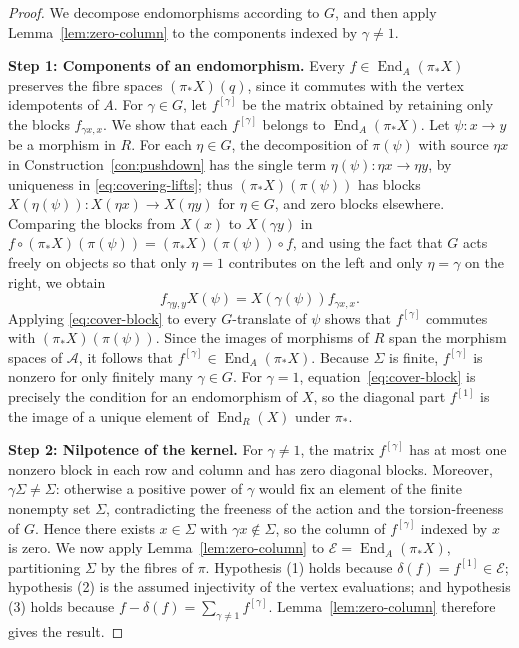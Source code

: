 \documentclass[a4paper,reqno,10pt]{amsart}
\theoremstyle{definition}
\DeclareMathOperator{\End}{End}
\numberwithin{equation}{section}
\begin{document}
\begin{proof}
We decompose endomorphisms according to $G$, and then apply
Lemma~\ref{lem:zero-column} to the components indexed by $\gamma\ne1$.

\noindent\textbf{Step 1: Components of an endomorphism.}
Every $f\in\End_A(\pi_*X)$ preserves the fibre spaces
$(\pi_*X)(q)$, since it commutes with the vertex idempotents of $A$.
For $\gamma\in G$, let $f^{[\gamma]}$ be the matrix obtained by retaining only the blocks $f_{\gamma x,x}$. We show that each $f^{[\gamma]}$ belongs to $\End_A(\pi_*X)$.
Let $\psi:x\to y$ be a morphism in $R$. For each $\eta\in G$, the
decomposition of $\pi(\psi)$ with source $\eta x$ in
Construction~\ref{con:pushdown} has the single term $\eta(\psi):\eta x\to \eta y$, by
uniqueness in \eqref{eq:covering-lifts}; thus $(\pi_*X)(\pi(\psi))$ has
blocks $X(\eta(\psi)):X(\eta x)\to X(\eta y)$ for $\eta\in G$, and zero blocks elsewhere.
Comparing the blocks from $X(x)$ to $X(\gamma y)$ in
$f\circ(\pi_*X)(\pi(\psi))=(\pi_*X)(\pi(\psi))\circ f$, and using the fact that $G$ acts freely on
objects so that only $\eta=1$ contributes on the left and only $\eta=\gamma$ on the right,
we obtain
\begin{equation}\label{eq:cover-block}
 f_{\gamma y,y}X(\psi)=X(\gamma(\psi))f_{\gamma x,x}.
\end{equation}
Applying \eqref{eq:cover-block} to every $G$-translate of $\psi$ shows
that $f^{[\gamma]}$ commutes with $(\pi_*X)(\pi(\psi))$. Since the images of morphisms
of $R$ span the morphism spaces of $\mathcal A$, it follows that $f^{[\gamma]}\in\End_A(\pi_*X)$.
Because $\Sigma$ is finite, $f^{[\gamma]}$ is nonzero for only finitely many $\gamma\in G$.
For $\gamma=1$, equation~\eqref{eq:cover-block} is precisely the condition for an
endomorphism of $X$, so the diagonal part $f^{[1]}$ is the image of a unique element of
$\End_R(X)$ under $\pi_*$.

\noindent\textbf{Step 2: Nilpotence of the kernel.}
For $\gamma\ne1$, the matrix $f^{[\gamma]}$ has at most one nonzero block in
each row and column and has zero diagonal blocks. Moreover, $\gamma\Sigma\ne\Sigma$:
otherwise a positive power of $\gamma$ would fix an element of the finite
nonempty set $\Sigma$, contradicting the freeness of the action and the
torsion-freeness of $G$. Hence there exists $x\in\Sigma$ with $\gamma x\notin\Sigma$,
so the column of $f^{[\gamma]}$ indexed by $x$ is zero.
We now apply Lemma~\ref{lem:zero-column} to $\mathcal E=\End_A(\pi_*X)$, partitioning
$\Sigma$ by the fibres of $\pi$. Hypothesis (1) holds because
$\delta(f)=f^{[1]}\in \mathcal E$; hypothesis (2) is the assumed
injectivity of the vertex evaluations; and hypothesis (3) holds because
$f-\delta(f)=\sum_{\gamma\ne1}f^{[\gamma]}$. Lemma~\ref{lem:zero-column} therefore gives the result.
\end{proof}
\end{document}
